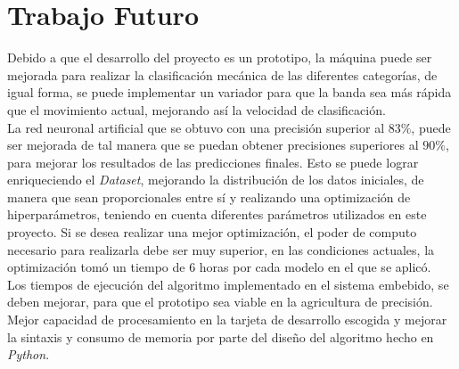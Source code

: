 \chapter{Trabajo Futuro}

Debido a que el desarrollo del proyecto es un prototipo, la máquina puede ser mejorada para realizar la clasificación mecánica de las diferentes categorías, de igual forma, se puede implementar un variador para que la banda sea más rápida que el movimiento actual, mejorando así la velocidad de clasificación.\\

La red neuronal artificial que se obtuvo con una precisión superior al $83\%$, puede ser mejorada de tal manera que se puedan obtener precisiones superiores al $90\%$, para mejorar los resultados de las predicciones finales. Esto se puede lograr enriqueciendo el \textit{Dataset}, mejorando la distribución de los datos iniciales, de manera que sean proporcionales entre sí y realizando una optimización de hiperparámetros, teniendo en cuenta diferentes parámetros utilizados en este proyecto. Si se desea realizar una mejor optimización, el poder de computo necesario para realizarla debe ser muy superior, en las condiciones actuales, la optimización tomó un tiempo de $6$ horas por cada modelo en el que se aplicó.\\

Los tiempos de ejecución del algoritmo implementado en el sistema embebido, se deben mejorar, para que el prototipo sea viable en la agricultura de precisión. Mejor capacidad de procesamiento en la tarjeta de desarrollo escogida y mejorar la sintaxis y consumo de memoria por parte del diseño del algoritmo hecho en \textit{Python}.










